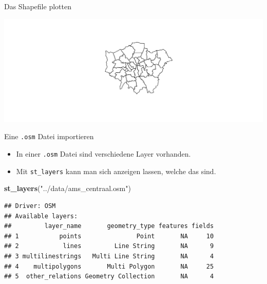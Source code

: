 \documentclass[ignorenonframetext,]{beamer}
\newenvironment{Shaded}{\begin{snugshade}}{\end{snugshade}}
\newcommand{\KeywordTok}[1]{\textcolor[rgb]{0.13,0.29,0.53}{\textbf{#1}}}
\newcommand{\StringTok}[1]{\textcolor[rgb]{0.31,0.60,0.02}{#1}}
\newcommand{\OperatorTok}[1]{\textcolor[rgb]{0.81,0.36,0.00}{\textbf{#1}}}
\newcommand{\NormalTok}[1]{#1}
\providecommand{\tightlist}{%
  \setlength{\itemsep}{0pt}\setlength{\parskip}{0pt}}
\begin{document}
\begin{frame}[fragile]{Das Shapefile plotten}

\begin{Shaded}
\end{Shaded}

\includegraphics{simplefeatures_files/figure-beamer/unnamed-chunk-16-1.pdf}

\end{frame}

\begin{frame}[fragile]{Eine \texttt{.osm} Datei importieren}

\begin{itemize}
\tightlist
\item
  In einer \texttt{.osm} Datei sind verschiedene Layer vorhanden.
\item
  Mit \texttt{st\_layers} kann man sich anzeigen lassen, welche das
  sind.
\end{itemize}

\begin{Shaded}
\begin{Highlighting}[]
\KeywordTok{st_layers}\NormalTok{(}\StringTok{"../data/ams_centraal.osm"}\NormalTok{)}
\end{Highlighting}
\end{Shaded}

\begin{verbatim}
## Driver: OSM 
## Available layers:
##         layer_name       geometry_type features fields
## 1           points               Point       NA     10
## 2            lines         Line String       NA      9
## 3 multilinestrings   Multi Line String       NA      4
## 4    multipolygons       Multi Polygon       NA     25
## 5  other_relations Geometry Collection       NA      4
\end{verbatim}

\end{frame}
\end{document}
